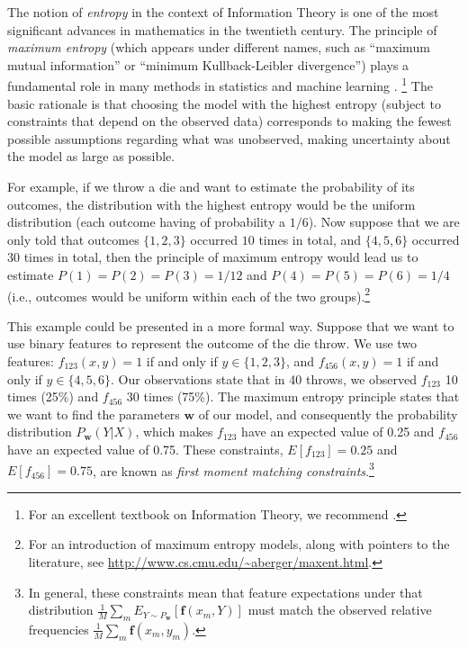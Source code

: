The notion of \emph{entropy} in the context of Information Theory \citep{Shannon1948} is one of the most significant advances 
in mathematics in the twentieth century. The principle of \emph{maximum entropy} (which appears under different names, 
such as ``maximum mutual information'' or  ``minimum Kullback-Leibler divergence'') plays a fundamental role 
in many methods in statistics and machine learning \citep{Jaynes1982}. \footnote{For an excellent textbook on Information Theory, we recommend \citet{Cover1991}. }
The basic rationale is that choosing the model with the highest entropy (subject to 
constraints that depend on the observed data) corresponds to making the fewest possible assumptions regarding what was unobserved, making uncertainty 
about the model as large as possible.

For example, if we throw a die and want to estimate the probability of its outcomes, the distribution with the highest entropy would be the
uniform distribution (each outcome having of probability a $1/6$).
Now suppose that we are only told that outcomes $\{1,2,3\}$ occurred $10$ times in total, and
$\{4,5,6\}$ occurred $30$ times in total, then the principle of maximum entropy would lead us to
estimate $P(1)=P(2)=P(3)=1/12$ and $P(4)=P(5)=P(6)=1/4$ (i.e., outcomes would be uniform
within each of the two groups).\footnote{For an introduction of maximum entropy models, along with pointers to the literature, see
\url{http://www.cs.cmu.edu/~aberger/maxent.html}.}

This example could be presented in a more formal way. Suppose that we want to use binary features to represent the outcome of the die throw. We use two features: $f_{123}(x,y) = 1$ if and only if $y \in \{1,2,3\}$, and $f_{456}(x,y) = 1$ if and only if $y \in \{4,5,6\}$. Our observations state that in 40 throws, we observed $f_{123}$ 10 times (25\%) and $f_{456}$ 30 times (75\%). The maximum entropy principle states that we want to find the parameters $\boldsymbol{w}$ of our model, and consequently the probability distribution $P_{\boldsymbol{w}}(Y|X)$, which makes $f_{123}$ have an expected value of 0.25 and $f_{456}$ have an expected value of 0.75. These constraints, $E[f_{123}] = 0.25$ and $E[f_{456}] = 0.75$, are known as \emph{first moment matching constraints}.\footnote{In general, these constraints mean that
feature expectations under that distribution $\frac{1}{M}\sum_m E_{Y \sim P_{\boldsymbol{w}}}[\boldsymbol{f}(x_m,Y)]$ 
must match the observed relative frequencies 
 $\frac{1}{M}\sum_m \boldsymbol{f}(x_m,y_m)$.}

